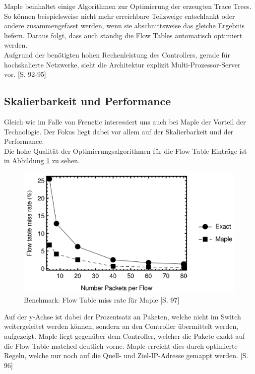\documentclass[10pt,conference]{IEEEtran}
\begin{document}
Maple beinhaltet einige Algorithmen zur Optimierung der erzeugten Trace Trees. So können beispielsweise nicht mehr erreichbare Teilzweige entschlankt oder andere zusammengefasst werden, wenn sie abschnittsweise das gleiche Ergebnis liefern. Daraus folgt, dass auch ständig die Flow Tables automatisch optimiert werden.\\
Aufgrund der benötigten hohen Rechenleistung des Controllers, gerade für hochskalierte Netzwerke, sieht die Architektur explizit Multi-Prozessor-Server vor. \cite{7}[S. 92-95]

\subsection{Skalierbarkeit und Performance}
Gleich wie im Falle von Frenetic interessiert uns auch bei Maple der Vorteil der Technologie. Der Fokus liegt dabei vor allem auf der Skalierbarkeit und der Performance.\\
Die hohe Qualität der Optimierungsalgorithmen für die Flow Table Einträge ist in Abbildung \ref{fig:mapleMissRate} zu sehen.
\begin{figure}[h]
	\centering
	\includegraphics[width=\columnwidth]{images/mapleMissRate.PNG}
	\caption{Benchmark: Flow Table miss rate für Maple \cite{7}[S. 97]}
	\label{fig:mapleMissRate}
\end{figure}
\newline
Auf der y-Achse ist dabei der Prozentsatz an Paketen, welche nicht im Switch weitergeleitet werden können, sondern an den Controller übermittelt werden, aufgezeigt. Maple liegt gegenüber dem Controller, welcher die Pakete exakt auf die Flow Table matched deutlich vorne. Maple erreicht dies durch optimierte Regeln, welche nur noch auf die Quell- und Ziel-IP-Adresse gemappt werden. \cite{7}[S. 96]\\
\end{document}
